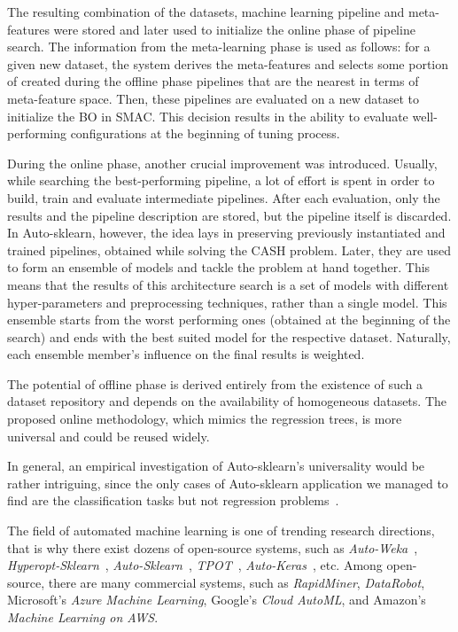 The resulting combination of the datasets, machine learning pipeline and meta-features were stored and later used to initialize the online phase of pipeline search.
The information from the meta-learning phase is used as follows: for a given new dataset, the system derives the meta-features and selects some portion of created during the offline phase pipelines that are the nearest in terms of meta-feature space. Then, these pipelines are evaluated on a new dataset to initialize the BO in SMAC. This decision results in the ability to evaluate well-performing configurations at the beginning of tuning process.

During the online phase, another crucial improvement was introduced. 
Usually, while searching the best-performing pipeline, a lot of effort is spent in order to build, train and evaluate intermediate pipelines. After each evaluation, only the results and the pipeline description are stored, but the pipeline itself is discarded. In Auto-sklearn, however, the idea lays in preserving previously instantiated and trained pipelines, obtained while solving the CASH problem. Later, they are used to form an ensemble of models and tackle the problem at hand together. This means that the results of this architecture search is a set of models with different hyper-parameters and preprocessing techniques, rather than a single model. This ensemble starts from the worst performing ones (obtained at the beginning of the search) and ends with the best suited model for the respective dataset. Naturally, each ensemble member's influence on the final results is weighted.

The potential of offline phase is derived entirely from the existence of such a dataset repository and depends on the availability of homogeneous datasets. The proposed online methodology, which mimics the regression trees, is more universal and could be reused widely.

In general, an empirical investigation of Auto-sklearn's universality would be rather intriguing, since the only cases of Auto-sklearn application we managed to find are the classification tasks but not regression problems~\cite{feurer2015efficient,biedenkapp-ecai20}.

The field of automated machine learning is one of trending research directions, that is why there exist dozens of open-source systems, such as \textit{Auto-Weka}~\cite{thornton2013auto}, \textit{Hyperopt-Sklearn}~\cite{komer2014hyperopt}, \textit{Auto-Sklearn}~\cite{feurer2015efficient}, \textit{TPOT}~\cite{olson2019tpot}, \textit{Auto-Keras}~\cite{jin2019auto}, etc. Among open-source, there are many commercial systems, such as \textit{RapidMiner}, \textit{DataRobot}, Microsoft’s \textit{Azure Machine Learning}, Google’s \textit{Cloud AutoML}, and Amazon's \textit{Machine Learning on AWS}.


